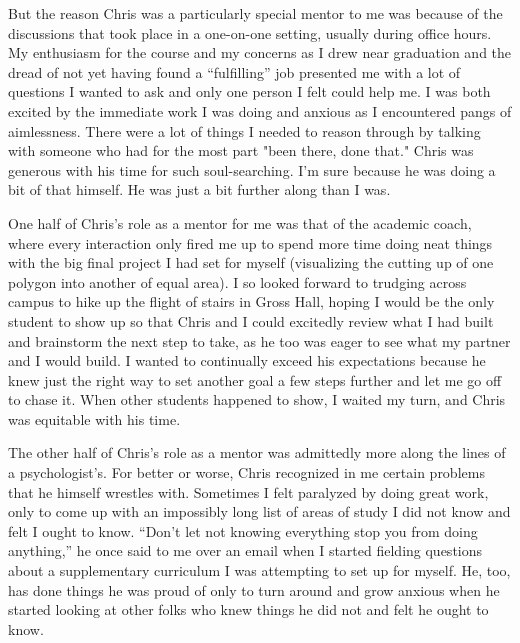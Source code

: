 \documentclass[a4paper, 11pt]{article} %
\begin{document}
But the reason Chris was a particularly special mentor to me was because of the discussions that took place in a one-on-one setting, usually during office hours. My enthusiasm for the course and my concerns as I drew near graduation and the dread of not yet having found a “fulfilling” job presented me with a lot of questions I wanted to ask and only one person I felt could help me. I was both excited by the immediate work I was doing and anxious as I encountered pangs of aimlessness. There were a lot of things I needed to reason through by talking with someone who had for the most part "been there, done that." Chris was generous with his time for such soul-searching. I'm sure because he was doing a bit of that himself. He was just a bit further along than I was.


One half of Chris's role as a mentor for me was that of the academic coach, where every interaction only fired me up to spend more time doing neat things with the big final project I had set for myself (visualizing the cutting up of one polygon into another of equal area). I so looked forward to trudging across campus to hike up the flight of stairs in Gross Hall, hoping I would be the only student to show up so that Chris and I could excitedly review what I had built and brainstorm the next step to take, as he too was eager to see what my partner and I would build. I wanted to continually exceed his expectations because he knew just the right way to set another goal a few steps further and let me go off to chase it. When other students happened to show, I waited my turn, and Chris was equitable with his time.


The other half of Chris’s role as a mentor was admittedly more along the lines of a psychologist's. For better or worse, Chris recognized in me certain problems that he himself wrestles with. Sometimes I felt paralyzed by doing great work, only to come up with an impossibly long list of areas of study I did not know and felt I ought to know. “Don’t let not knowing everything stop you from doing anything,” he once said to me over an email when I started fielding questions about a supplementary curriculum I was attempting to set up for myself. He, too, has done things he was proud of only to turn around and grow anxious when he started looking at other folks who knew things he did not and felt he ought to know.
\end{document}
